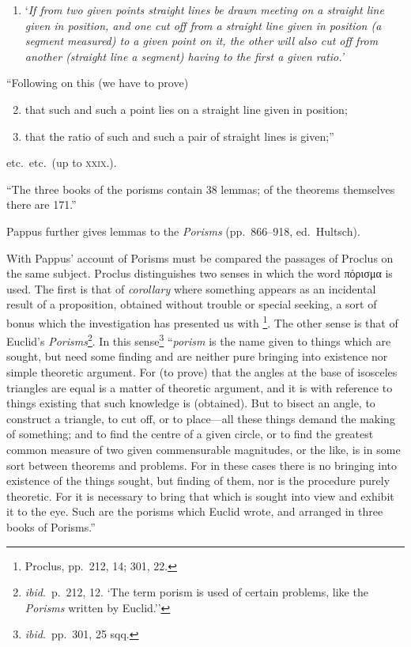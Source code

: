 \begin{enumerate}[label=\Roman*.]
	\item `\emph{If from two given points straight lines be drawn meeting on a straight line given in position, and one cut off from a straight line given in position (a segment measured) to a given point on it, the other will also cut off from another (straight line a segment) having to the first a given ratio.'}
\end{enumerate}

``Following on this (we have to prove)
\begin{enumerate}[label=\Roman*.]
	\setcounter{enumi}{1}
	\item that such and such a point lies on a straight line given in position;
	\item that the ratio of such and such a pair of straight lines is given;''
\end{enumerate}
etc.\ etc.\ (up to \textsc{xxix}.).

``The three books of the porisms contain 38 lemmas; of the theorems themselves there are 171.''

Pappus further gives lemmas to the \emph{Porisms} (pp.~866--918, ed.~Hultsch).

With Pappus' account of Porisms must be compared the passages of Proclus on the same subject. Proclus distinguishes two senses in which the word πόρισμα is used. The first is that of \emph{corollary} where something appears as an incidental result of a proposition, obtained without trouble or special seeking, a sort of bonus which the investigation has presented us with \footnote{Proclus, pp.~212, 14; 301, 22.}. The other sense is that of Euclid's \emph{Porisms}\footnote{\emph{ibid}.\ p.~212, 12. `The term porism is used of certain problems, like the \emph{Porisms} written by Euclid.''}. In this sense\footnote{\emph{ibid}.\ pp.~301, 25 sqq.} ``\emph{porism} is the name given to things which are sought, but need some finding and are neither pure bringing into existence nor simple theoretic argument. For (to prove) that the angles at the base of isosceles triangles are equal is a matter of theoretic argument, and it is with reference to things existing that such knowledge is (obtained). But to bisect an angle, to construct a triangle, to cut off, or to place---all these things demand the making of something; and to find the centre of a given circle, or to find the greatest common measure of two given commensurable magnitudes, or the like, is in some sort between theorems and problems. For in these cases there is no bringing into existence of the things sought, but finding of them, nor is the procedure purely theoretic. For it is necessary to bring that which is sought into view and exhibit it to the eye. Such are the porisms which Euclid wrote, and arranged in three books of Porisms.''

